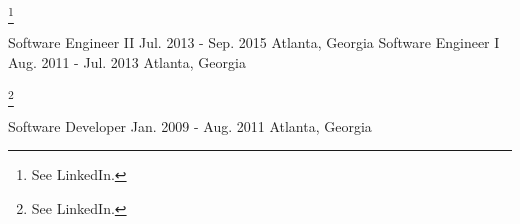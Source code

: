 \footnote[1]{See LinkedIn.}

\begin{cvhonors}
  \cvhonor
    {Software Engineer II}
    {Jul. 2013 - Sep. 2015}
    {Atlanta, Georgia}
    {}
  \cvhonor
    {Software Engineer I}
    {Aug. 2011 - Jul. 2013}
    {Atlanta, Georgia}
    {}
\end{cvhonors}

\footnote[1]{See LinkedIn.}

\begin{cvhonors}
  \cvhonor
    {Software Developer}
    {Jan. 2009 - Aug. 2011}
    {Atlanta, Georgia}
    {}
\end{cvhonors}

